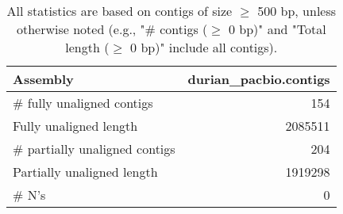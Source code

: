 \documentclass[12pt,a4paper]{article}
\begin{document}
\begin{table}[ht]
\begin{center}
\caption{All statistics are based on contigs of size $\geq$ 500 bp, unless otherwise noted (e.g., "\# contigs ($\geq$ 0 bp)" and "Total length ($\geq$ 0 bp)" include all contigs).}
\begin{tabular}{|l*{1}{|r}|}
\hline
Assembly & durian\_pacbio.contigs \\ \hline
\# fully unaligned contigs & 154 \\ \hline
Fully unaligned length & 2085511 \\ \hline
\# partially unaligned contigs & 204 \\ \hline
Partially unaligned length & 1919298 \\ \hline
\# N's & 0 \\ \hline
\end{tabular}
\end{center}
\end{table}
\end{document}
